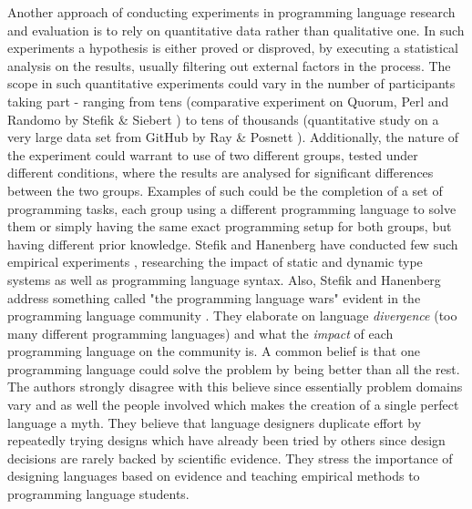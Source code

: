 Another approach of conducting experiments in programming language research and evaluation is to rely on quantitative data rather than qualitative one. In such experiments a hypothesis is either proved or disproved, by executing a statistical analysis on the results, usually filtering out external factors in the process. The scope in such quantitative experiments could vary in the number of participants taking part - ranging from tens (comparative experiment on Quorum, Perl and Randomo by Stefik \& Siebert \cite{QuorumRandomo}) to tens of thousands (quantitative study on a very large data set from GitHub by Ray \& Posnett \cite{GitHubExperiment}). Additionally, the nature of the experiment could warrant to use of two different groups, tested under different conditions, where the results are analysed for significant differences between the two groups. Examples of such could be the completion of a set of programming tasks, each group using a different programming language to solve them or simply having the same exact programming setup for both groups, but having different prior knowledge. Stefik and Hanenberg have conducted few such empirical experiments \cite{StaticTypes},\cite{ProgLangSyntax} researching the impact of static and dynamic type systems as well as programming language syntax. Also, Stefik and Hanenberg address something called "the programming language wars" evident in the programming language community \cite{ProgrammingWars}. They elaborate on language \textit{divergence} (too many different programming languages) and what the \textit{impact} of each programming language on the community is. A common belief is that one programming language could solve the problem by being better than all the rest. The authors strongly disagree with this believe since essentially problem domains vary and as well the people involved which makes the creation of a single perfect language a myth. They believe that language designers duplicate effort by repeatedly trying designs which have already been tried by others since design decisions are rarely backed by scientific evidence. They stress the importance of designing languages based on evidence and teaching empirical methods to programming language students.